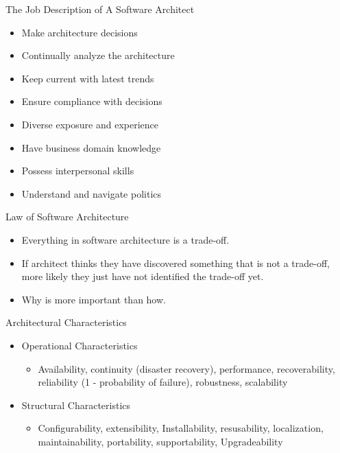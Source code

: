 \documentclass[aspectratio=169, table]{beamer}
\begin{document}
	\begin{frame}{The Job Description of A Software Architect}
		\begin{itemize}
			\item Make architecture decisions
			\item Continually analyze the architecture
			\item Keep current with latest trends
			\item Ensure compliance with decisions
			\item Diverse exposure and experience
			\item Have business domain knowledge
			\item Possess interpersonal skills
			\item Understand and navigate politics
		\end{itemize}
	\end{frame}

	\begin{frame}{Law of Software Architecture}
		\begin{itemize}
			\item Everything in software architecture is a trade-off.
			\item If architect thinks they have discovered something that is not a trade-off, more likely they just have not identified the trade-off yet.
			\item Why is more important than how.
		\end{itemize}
	\end{frame}

	\begin{frame}{Architectural Characteristics}
		\begin{itemize}
			\item Operational Characteristics
			\begin{itemize}
				\item Availability, continuity (disaster recovery), performance, recoverability,
				reliability (1 - probability of failure), robustness, scalability
			\end{itemize}
			\item Structural Characteristics
			\begin{itemize}
				\item Configurability, extensibility, Installability, resusability, localization, maintainability, portability, supportability, Upgradeability
			\end{itemize}

		\end{itemize}
	\end{frame}
\end{document}
